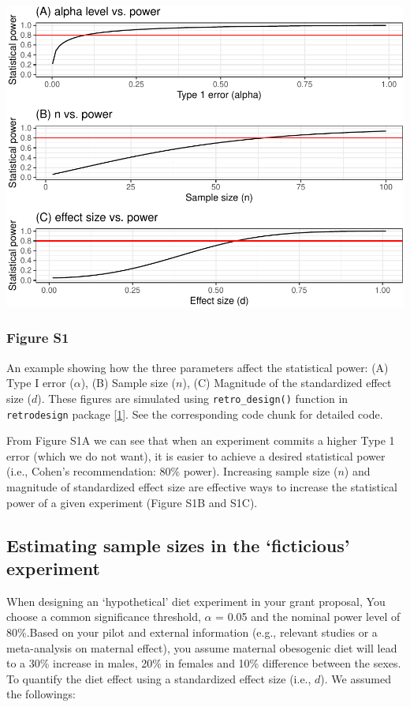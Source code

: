 \documentclass[
]{article}
\begin{document}
\includegraphics{code_power_analysis_short_files/figure-latex/unnamed-chunk-2-1.pdf}

\hypertarget{figure-s1}{%
\subsubsection{Figure S1}\label{figure-s1}}

An example showing how the three parameters affect the statistical
power: (A) Type I error (\(\alpha\)), (B) Sample size (\(n\)), (C)
Magnitude of the standardized effect size (\(d\)). These figures are
simulated using \texttt{retro\_design()} function in
\texttt{retrodesign} package
{[}\protect\hyperlink{ref-gelman2014beyond}{1}{]}. See the corresponding
code chunk for detailed code.

From Figure S1A we can see that when an experiment commits a higher Type
1 error (which we do not want), it is easier to achieve a desired
statistical power (i.e., Cohen's recommendation: 80\% power). Increasing
sample size (\(n\)) and magnitude of standardized effect size are
effective ways to increase the statistical power of a given experiment
(Figure S1B and S1C).

\hypertarget{estimating-sample-sizes-in-the-ficticious-experiment}{%
\subsection{Estimating sample sizes in the `ficticious'
experiment}\label{estimating-sample-sizes-in-the-ficticious-experiment}}

When designing an `hypothetical' diet experiment in your grant proposal,
You choose a common significance threshold, \(\alpha\) = 0.05 and the
nominal power level of 80\%.Based on your pilot and external information
(e.g., relevant studies or a meta-analysis on maternal effect), you
assume maternal obesogenic diet will lead to a 30\% increase in males,
20\% in females and 10\% difference between the sexes. To quantify the
diet effect using a standardized effect size (i.e., \(d\)). We assumed
the followings:
\end{document}
